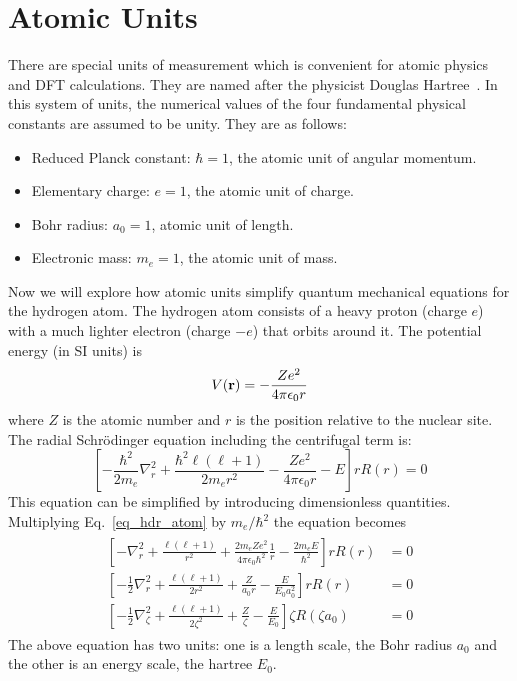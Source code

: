 \chapter{Atomic Units}\label{appen_atomicunit}
There are special units of measurement which is convenient for atomic physics and DFT calculations. They are named after the physicist Douglas Hartree~\cite{hartree}. In this system of units, the numerical values of the four fundamental physical constants are assumed to be unity. They are as follows:
\begin{itemize}
\item Reduced Planck constant: $\hbar = 1$, the atomic unit of angular momentum.
\item Elementary charge: $e = 1$, the atomic unit of charge.
\item Bohr radius: $a_0 = 1$, atomic unit of length.
\item Electronic mass: $m_e = 1$, the atomic unit of mass.
\end{itemize}
Now we will explore how atomic units simplify quantum mechanical equations for the hydrogen atom. The hydrogen atom consists of a heavy proton (charge $e$) with a much lighter electron (charge $-e$) that orbits around it. The potential energy (in SI units) is
\begin{equation}\label{eq_hyd_pot}
V(\vb{r}) = -\frac{Ze^2}{4\pi \epsilon_0 r}
\end{equation}
where $Z$ is the atomic number and $r$ is the position relative to the nuclear site. The radial Schr\"odinger equation including the centrifugal term is:
\begin{equation}\label{eq_hdr_atom}
	\left [ -\frac{\hbar^2}{2m_e}\nabla_r^2 + \frac{\hbar^2 \ell (\ell+1)}{2m_er^2} - \frac{Ze^2}{4\pi \epsilon_0 r} - E \right ]rR(r) = 0
\end{equation}
This equation can be simplified by introducing dimensionless quantities. Multiplying Eq.~\eqref{eq_hdr_atom} by $m_e/\hbar^2$ the equation becomes
\begin{align}
\begin{split}
\left [-\nabla^2_r + \frac{\ell(\ell+1)}{r^2} + \frac{2m_eZe^2}{4\pi\epsilon_0\hbar^2} \frac{1}{r} - \frac{2m_eE}{\hbar^2} \right ] rR(r) & = 0 \\
\left [ -\frac{1}{2} \nabla_r^2 + \frac{\ell(\ell+1)}{2r^2} + \frac{Z}{a_0r} - \frac{E}{E_0a_0^2}    \right ]rR(r) & = 0 \\
\left [-\frac{1}{2}\nabla_{\zeta}^2 + \frac{\ell(\ell+1)}{2\zeta^2} + \frac{Z}{\zeta} - \frac{E}{E_0}    \right ] \zeta R(\zeta a_0) & = 0
\end{split}
\end{align} 
The above equation has two units: one is a length scale, the Bohr radius $a_0$ and the other is an energy scale, the hartree $E_0$.

